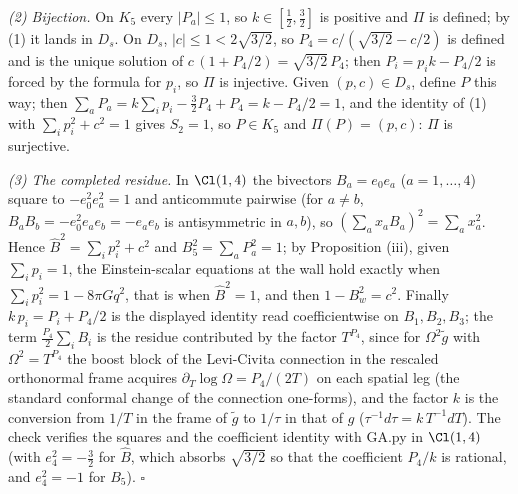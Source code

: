 \emph{(2) Bijection.} On $K_{5}$ every $|P_a| \le 1$, so $k \in [\frac12, \frac32]$ is positive and $\Pi$ is defined; by (1) it lands in $D_s$. On $D_s$, $|c| \le 1 < 2\sqrt{3/2}$, so $P_4 = c/(\sqrt{3/2} - c/2)$ is defined and is the unique solution of $c\,(1 + P_4/2) = \sqrt{3/2}\,P_4$; then $P_i = p_ik - P_4/2$ is forced by the formula for $p_i$, so $\Pi$ is injective. Given $(p, c) \in D_s$, define $P$ this way; then $\sum_a P_a = k\sum_i p_i - \frac32P_4 + P_4 = k - P_4/2 = 1$, and the identity of (1) with $\sum_i p_i^{2} + c^{2} = 1$ gives $S_2 = 1$, so $P \in K_{5}$ and $\Pi(P) = (p, c)$: $\Pi$ is surjective.

\emph{(3) The completed residue.} In $\Cl(1,4)$ the bivectors $B_a = e_0e_a$ ($a = 1, \dots, 4$) square to $-e_0^{2}e_a^{2} = 1$ and anticommute pairwise (for $a \neq b$, $B_aB_b = -e_0^{2}e_ae_b = -e_ae_b$ is antisymmetric in $a, b$), so $(\sum_a x_aB_a)^{2} = \sum_a x_a^{2}$. Hence $\hat B^{2} = \sum_i p_i^{2} + c^{2}$ and $B_5^{2} = \sum_a P_a^{2} = 1$; by Proposition (iii), given $\sum_i p_i = 1$, the Einstein-scalar equations at the wall hold exactly when $\sum_i p_i^{2} = 1 - 8\pi Gq^{2}$, that is when $\hat B^{2} = 1$, and then $1 - B_w^{2} = c^{2}$. Finally $k\,p_i = P_i + P_4/2$ is the displayed identity read coefficientwise on $B_1, B_2, B_3$; the term $\frac{P_4}{2}\sum_iB_i$ is the residue contributed by the factor $T^{P_4}$, since for $\Omega^{2}\tilde g$ with $\Omega^{2} = T^{P_4}$ the boost block of the Levi-Civita connection in the rescaled orthonormal frame acquires $\partial_T\log\Omega = P_4/(2T)$ on each spatial leg (the standard conformal change of the connection one-forms), and the factor $k$ is the conversion from $1/T$ in the frame of $\tilde g$ to $1/\tau$ in that of $g$ ($\tau^{-1}d\tau = k\,T^{-1}dT$). The check verifies the squares and the coefficient identity with GA.py in $\Cl(1,4)$ (with $e_4^{2} = -\frac32$ for $\hat B$, which absorbs $\sqrt{3/2}$ so that the coefficient $P_4/k$ is rational, and $e_4^{2} = -1$ for $B_5$). $\square$
